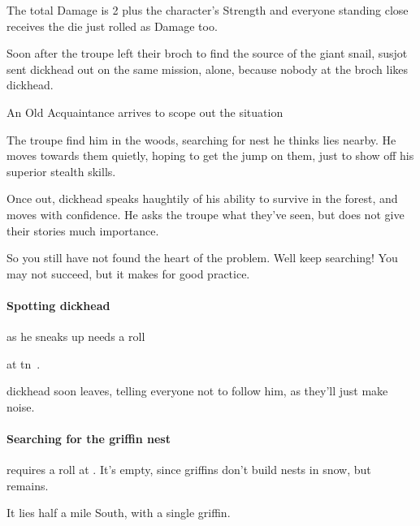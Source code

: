 \begin{multicols}{2}
The total Damage is 2 plus the character's Strength%
and everyone standing close receives the die just rolled as Damage too.


\noindent
Soon after the troupe left their \gls{broch} to find the source of the giant snail, \gls{susjot} sent \gls{dickhead} out on the same mission, alone, because nobody at the \gls{broch} likes \gls{dickhead}.

{An Old Acquaintance}%
{ arrives to scope out the situation}%

The troupe find him in the woods, searching for  nest he thinks lies nearby.
He moves towards them quietly, hoping to get the jump on them, just to show off his superior stealth \glspl{skill}.

Once out, \gls{dickhead} speaks haughtily of his ability to survive in the forest, and moves with confidence.
He asks the troupe what they've seen, but does not give their stories much importance.

\begin{speechtext}
  So you still have not found the heart of the problem.
  Well keep searching!
  You may not succeed, but it makes for good practice.
\end{speechtext}

\dickhead

\paragraph{Spotting \gls{dickhead}}
as he sneaks up needs a  roll
%
\addtocounter{track}{\value{Dexterity}}%
\addtocounter{track}{\value{Stealth}}%
at \gls{tn}~.

\Gls{dickhead} soon leaves, telling everyone not to follow him, as they'll just make noise.

\label{sunwayAirIngredients}
\paragraph{Searching for the \gls{griffin} nest}
requires a  roll at \tn[12].
\ifcase\value{temperature}%
  It's empty, since \glspl{griffin} don't build nests in snow, but  remains.

\or%
  It lies half a mile South, with a single \gls{griffin}.


\end{multicols}
